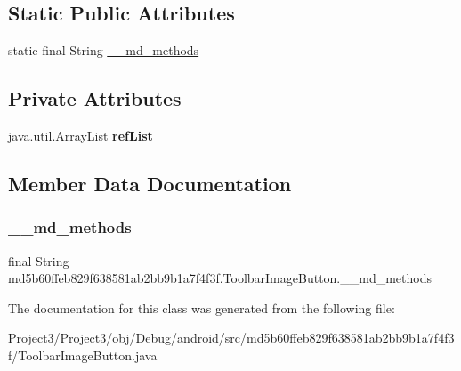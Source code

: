 \subsection*{Static Public Attributes}
\begin{DoxyCompactItemize}
\item 
static final String \hyperlink{classmd5b60ffeb829f638581ab2bb9b1a7f4f3f_1_1ToolbarImageButton_a581edb38bbe374fe7d3ceed23ee694df}{\+\_\+\+\_\+md\+\_\+methods}
\end{DoxyCompactItemize}
\subsection*{Private Attributes}
\begin{DoxyCompactItemize}
\item 
\mbox{\label{classmd5b60ffeb829f638581ab2bb9b1a7f4f3f_1_1ToolbarImageButton_a0a2d6944fb1b2de17004833a15342f25}} 
java.\+util.\+Array\+List {\bfseries ref\+List}
\end{DoxyCompactItemize}


\subsection{Member Data Documentation}
\mbox{\label{classmd5b60ffeb829f638581ab2bb9b1a7f4f3f_1_1ToolbarImageButton_a581edb38bbe374fe7d3ceed23ee694df}} 
\subsubsection{\texorpdfstring{\+\_\+\+\_\+md\+\_\+methods}{\_\_md\_methods}}
{\footnotesize\ttfamily final String md5b60ffeb829f638581ab2bb9b1a7f4f3f.\+Toolbar\+Image\+Button.\+\_\+\+\_\+md\+\_\+methods\hspace{0.3cm}{\ttfamily [static]}}



The documentation for this class was generated from the following file\+:\begin{DoxyCompactItemize}
\item 
Project3/\+Project3/obj/\+Debug/android/src/md5b60ffeb829f638581ab2bb9b1a7f4f3f/Toolbar\+Image\+Button.\+java\end{DoxyCompactItemize}
